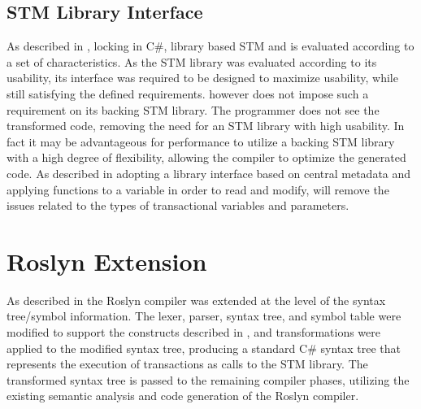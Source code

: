 \subsection{STM Library Interface}
As described in , locking in C\#, library based \ac{STM} and \stmname is evaluated according to a set of characteristics. As the \ac{STM} library was evaluated according to its usability, its interface was required to be designed to maximize usability, while still satisfying the defined requirements. \stmname however does not impose such a requirement on its backing \ac{STM} library. The programmer does not see the transformed code, removing the need for an \ac{STM} library with high usability. In fact it may be advantageous for performance to utilize a backing \ac{STM} library with a high degree of flexibility, allowing the compiler to optimize the generated code. As described in  adopting a library interface based on central metadata and applying functions to a variable in order to read and modify, will remove the issues related to the types of transactional variables and  parameters.

\section{Roslyn Extension}\label{sec:reflection_roslyn_extension}
As described in  the Roslyn compiler was extended at the level of the syntax tree/symbol information. The lexer, parser, syntax tree, and symbol table were modified to support the constructs described in , and transformations were applied to the modified syntax tree, producing a standard C\# syntax tree that represents the execution of transactions as calls to the \ac{STM} library. The transformed syntax tree is passed to the remaining compiler phases, utilizing the existing semantic analysis and code generation of the Roslyn compiler.

